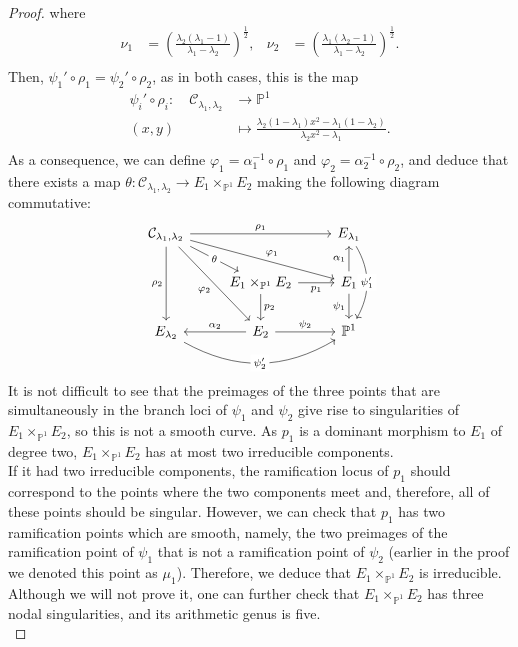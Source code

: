 \documentclass{amsart}
\newcommand{\calC}{\mathcal{C}}
\numberwithin{equation}{section}
\theoremstyle{definition}
\theoremstyle{remark}
\begin{document}
\begin{proof}
where
\begin{align*}
\nu_1&=\left(\frac{\lambda_2(\lambda_1-1)}{\lambda_1-\lambda_2}\right)^\frac{1}{2}, & \nu_2&=\left(\frac{\lambda_1(\lambda_2-1)}{\lambda_1-\lambda_2}\right)^\frac{1}{2}.\\
\end{align*}
Then, $\psi_1'\circ\rho_1=\psi_2'\circ\rho_2$, as in both cases, this is the map
\begin{align*}
\psi_i'\circ\rho_i\colon\quad \calC_{\lambda_1,\lambda_2}&\longrightarrow \mathbb{P}^1\\
(x,y)&\longmapsto \frac{\lambda_2(1-\lambda_1)x^2-\lambda_1(1-\lambda_2)}{\lambda_2x^2-\lambda_1}.\\
\end{align*}
As a consequence, we can define  $\varphi_1=\alpha_1^{-1}\circ\rho_1$ and $\varphi_2=\alpha_2^{-1}\circ\rho_2$, and deduce that there exists a map $\theta:\calC_{\lambda_1,\lambda_2}\rightarrow E_1\times_{\mathbb{P}^1}E_2$ making the following diagram commutative:
\[
\begin{tikzcd}
\calC_{\lambda_1,\lambda_2} \arrow[rd, "\theta" description] \arrow[rrd, "\varphi_1"] \arrow[rdd, "\varphi_2"'] \arrow[rr, "\rho_1"] \arrow[dd, "\rho_2"'] &                                                                & E_{\lambda_1} \arrow[dd, "\psi_1'" description, bend left] \\
                                                                                                                                        & E_1\times_{\mathbb{P}^1}E_2 \arrow[r, "p_1"'] \arrow[d, "p_2"] & E_1 \arrow[d, "\psi_1"'] \arrow[u, "\alpha_1"]               \\
E_{\lambda_2} \arrow[rr, "\psi_2'" description, bend right]                                                                             & E_2 \arrow[r, "\psi_2"] \arrow[l, "\alpha_2"']                   & \mathbb{P}^1                                              
\end{tikzcd}\vspace{10pt}
\]
It is not difficult to see that the preimages of the three points that are simultaneously in the branch loci of $\psi_1$ and $\psi_2$ give rise to singularities of $E_1\times_{\mathbb{P}^1}E_2$, so this is not a smooth curve. As $p_1$ is a dominant morphism to $E_1$ of degree two, $E_1\times_{\mathbb{P}^1}E_2$ has at most two irreducible components.\\

If it had two irreducible components, the ramification locus of $p_1$ should correspond to the points where the two components meet and, therefore, all of these points should be singular. However, we can check that $p_1$ has two ramification points which are smooth, namely, the two preimages of the ramification point of $\psi_1$ that is not a ramification point of $\psi_2$ (earlier in the proof we denoted this point as $\mu_1$). Therefore, we deduce that $E_1\times_{\mathbb{P}^1}E_2$ is irreducible. Although we will not prove it, one can further check that $E_1\times_{\mathbb{P}^1}E_2$ has three nodal singularities, and its arithmetic genus is five.\\


\end{proof}
\end{document}
